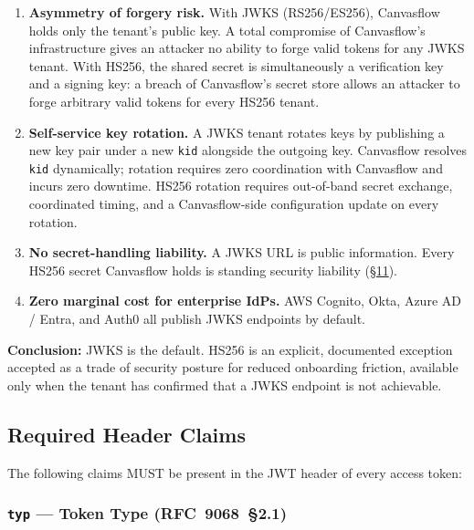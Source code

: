 \begin{enumerate}
  \item \textbf{Asymmetry of forgery risk.} With JWKS (RS256/ES256), Canvasflow holds
    only the tenant's public key. A total compromise of Canvasflow's infrastructure gives
    an attacker no ability to forge valid tokens for any JWKS tenant. With HS256, the
    shared secret is simultaneously a verification key and a signing key: a breach of
    Canvasflow's secret store allows an attacker to forge arbitrary valid tokens for
    every HS256 tenant.

  \item \textbf{Self-service key rotation.} A JWKS tenant rotates keys by publishing a
    new key pair under a new \texttt{kid} alongside the outgoing key. Canvasflow
    resolves \texttt{kid} dynamically; rotation requires zero coordination with Canvasflow
    and incurs zero downtime. HS256 rotation requires out-of-band secret exchange,
    coordinated timing, and a Canvasflow-side configuration update on every rotation.

  \item \textbf{No secret-handling liability.} A JWKS URL is public information. Every
    HS256 secret Canvasflow holds is standing security liability (\hyperref[sec:canvasflow-guarantees]{\S11}).

  \item \textbf{Zero marginal cost for enterprise IdPs.} AWS Cognito, Okta, Azure AD /
    Entra, and Auth0 all publish JWKS endpoints by default.
\end{enumerate}

\textbf{Conclusion:} JWKS is the default. HS256 is an explicit, documented exception
accepted as a trade of security posture for reduced onboarding friction, available only
when the tenant has confirmed that a JWKS endpoint is not achievable.

\subsection{Required Header Claims}

The following claims MUST be present in the JWT header of every access token:



\subsubsection{\texttt{typ} --- Token Type (RFC~9068~\S2.1)}\label{sec:token-type}

